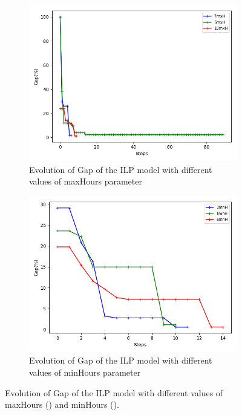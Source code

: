 \begin{figure}[h!]
\begin{subfigure}[b]{.49\linewidth}
\centering
\includegraphics[width=\linewidth]{./img/instances_maxhours_ilp_evol.png}
\caption{Evolution of Gap of the ILP model with different values of maxHours parameter }\label{fig1c}
\end{subfigure}
\begin{subfigure}[b]{.49\linewidth}
\centering
\includegraphics[width=\linewidth]{./img/instances_minhours_ilp_evol.png}
\caption{Evolution of Gap of the ILP model with different values of minHours parameter }\label{fig1d}
\end{subfigure}
\caption{Evolution of Gap of the ILP model with different values of maxHours () and minHours ().  }
\label{fig_ilp_size3}
\end{figure}




